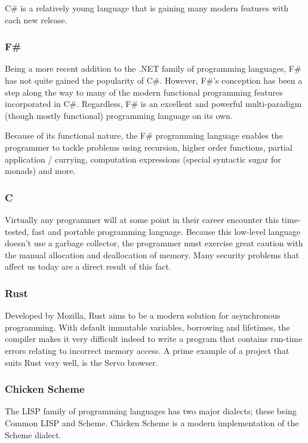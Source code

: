 \documentclass{article}
\begin{document}
C\# is a relatively young language that is gaining many modern features with each new release.

\subsubsection{F\#}
Being a more recent addition to the .NET family of programming languages, F\# has not quite gained the popularity of C\#.
However, F\#'s conception has been a step along the way to many of the modern functional programming features incorporated in C\#.
Regardless, F\# is an excellent and powerful multi-paradigm (though mostly functional) programming language on its own.

Because of its functional nature, the F\# programming language enables the programmer to tackle problems using
recursion, higher order functions, partial application / currying, computation expressions (special syntactic sugar for monads)  and more.

\subsubsection{C}
Virtually any programmer will at some point in their career encounter this time-tested, fast and portable programming language.
Because this low-level language doesn't use a garbage collector, the programmer must exercise great caution with the manual allocation
and deallocation of memory. Many security problems that affect us today are a direct result of this fact.

\subsubsection{Rust}
Developed by Mozilla, Rust aims to be a modern solution for asynchronous programming.
With default immutable variables, borrowing and lifetimes, the compiler makes it very difficult indeed to
write a program that contains run-time errors relating to incorrect memory access.
A prime example of a project that suits Rust very well, is the Servo browser.

\subsubsection{Chicken Scheme}
The LISP family of programming languages has two major dialects; these being Common LISP and Scheme.
Chicken Scheme is a modern implementation of the Scheme dialect.

\newpage
\end{document}
